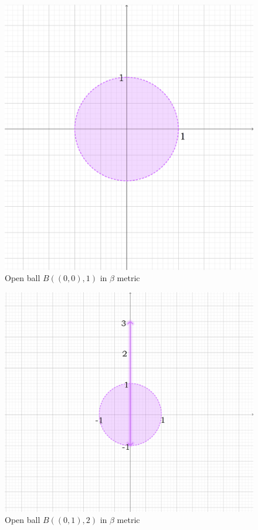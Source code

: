 \documentclass[12pt]{article}
\begin{document}
	\begin{figure}
		\centering
		\includegraphics[scale=0.20] {graph4}
		\caption{\label{fig:4} Open ball $B((0,0), 1) $ in $\beta$ metric }
	\end{figure}
	
	
	\begin{figure}
		\centering
		\includegraphics[scale=0.20] {graph5}
		\caption{\label{fig:5} Open ball $B((0,1), 2) $ in $\beta$ metric }
	\end{figure}
	
\end{document}

